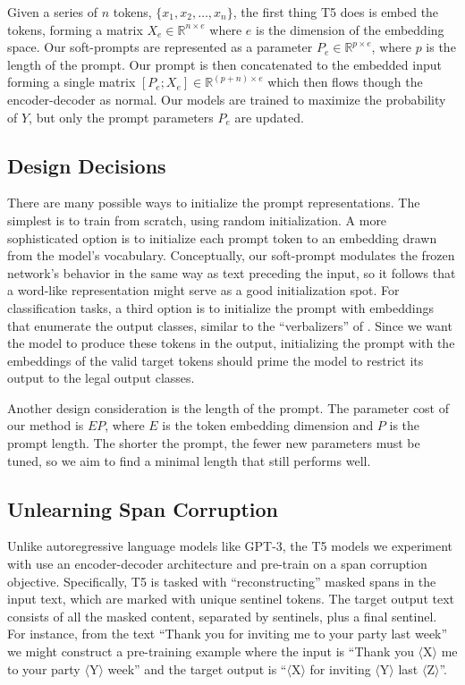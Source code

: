\documentclass[11pt]{article}
\begin{document}
Given a series of $n$ tokens, $\{x_1, x_2, \dots, x_n\}$, the first thing T5 does is embed the tokens, forming a matrix $X_e \in \mathbb{R}^{n \times e}$ where $e$ is the dimension of the embedding space. Our soft-prompts are represented as a parameter $P_e \in \mathbb{R}^{p \times e}$, where $p$ is the length of the prompt. Our prompt is then concatenated to the embedded input forming a single matrix $[P_e;X_e] \in \mathbb{R}^{(p+n)\times e}$ which then flows though the encoder-decoder as normal. Our models are trained to maximize the probability of $Y$, but only the prompt parameters $P_e$ are updated.

\subsection{Design Decisions}

There are many possible ways to initialize the prompt representations. The simplest is to train from scratch, using random initialization. A more sophisticated option is to initialize each prompt token to an embedding drawn from the model's vocabulary. Conceptually, our soft-prompt modulates the frozen network's behavior in the same way as text preceding the input, so it follows that a word-like representation might serve as a good initialization spot. For classification tasks, a third option is to initialize the prompt with embeddings that enumerate the output classes, similar to the ``verbalizers'' of \citet{schick-schutze-2021-exploiting}. Since we want the model to produce these tokens in the output, initializing the prompt with the embeddings of the valid target tokens should prime the model to restrict its output to the legal output classes. %

Another design consideration is the length of the prompt. The parameter cost of our method is $EP$, where $E$ is the token embedding dimension and $P$ is the prompt length. The shorter the prompt, the fewer new parameters must be tuned, so we aim to find a minimal length that still performs well.

\subsection{Unlearning Span Corruption}
\label{sec:span_corruption}

Unlike autoregressive language models like \mbox{GPT-3}, the T5 models we experiment with use an encoder-decoder architecture and pre-train on a span corruption objective. Specifically, T5 is tasked with ``reconstructing'' masked spans in the input text, which are marked with unique sentinel tokens. The target output text consists of all the masked content, separated by sentinels, plus a final sentinel. For instance, from the text ``Thank you for inviting me to your party last week'' we might construct a pre-training example where the input is ``Thank you $\langle$X$\rangle$ me to your party $\langle$Y$\rangle$ week'' and the target output is ``$\langle$X$\rangle$ for inviting $\langle$Y$\rangle$ last $\langle$Z$\rangle$''.
\end{document}
